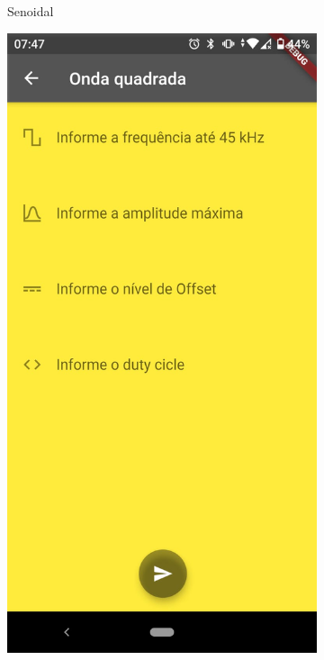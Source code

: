 \documentclass[12pt,a4paper]{book}
\begin{document}
\begin{figure}
\begin{subfigure}[b]{0.3\textwidth}
        \caption{Senoidal}
        \label{fig:sin}
    \end{subfigure}
    \begin{subfigure}[b]{0.3\textwidth}
        \centering
        \includegraphics[width=\textwidth]{figs/sq.png}

\end{subfigure}
\end{figure}
\end{document}
